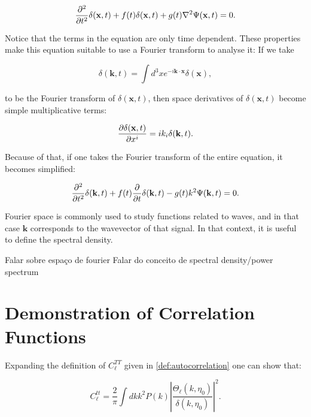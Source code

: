 \documentclass[openany,a4paper,12pt,oneside]{book}
\begin{document}
\begin{spacing}{1.5}
\begin{equation}\label{Four_Space:example_diff_eq}
	\pdv[2]{}{t} \delta(\mathbf{x},t) +f(t)\delta(\mathbf{x},t) + g(t)\nabla^2\Psi(\mathbf{x},t)=0.
\end{equation}

Notice that the terms in the equation are only time dependent. These properties make this equation suitable to use a Fourier transform to analyse it: If we take

\begin{equation}
	\delta(\mathbf{k},t)=\int d^3x e^{-i\mathbf{k}\cdot \mathbf{x}}\delta(\mathbf{x}),
\end{equation}

\noindent to be the Fourier transform of $\delta(\mathbf{x},t)$, then space derivatives of $\delta(\mathbf{x},t)$ become simple multiplicative terms:

\begin{equation}
	\pdv{\delta(\mathbf{x},t)}{x^i}=ik_i\delta(\mathbf{k},t).
\end{equation}

Because of that, if one takes the Fourier transform of the entire equation, it becomes simplified:

\begin{equation}\label{Four_Space:final_eq}
	\pdv[2]{}{t}\delta(\mathbf{k},t)+f(t)\pdv{}{t}\delta(\mathbf{k},t)-g(t)k^2\Psi(\mathbf{k},t)=0.
\end{equation}

Fourier space is commonly used to study functions related to waves, and in that case $\mathbf{k}$ corresponds to the wavevector of that signal. In that context, it is useful to define the spectral density.

Falar sobre espaço de fourier
Falar do conceito de spectral density/power spectrum
\fi

\chapter{Demonstration of Correlation Functions}\label{App:correlations_demo}

Expanding the definition of $C_\ell^{TT}$ given in \eqref{def:autocorrelation} one can show that\cite{dodelson2020modern}:

\begin{equation}\label{demo:Start_eq}
	C_\ell^{tt}=\frac{2}{\pi}\int dk k^2P(k)\left|\frac{\Theta_\ell(k,\eta_0)}{\delta(k,\eta_0)}\right|^2.
\end{equation}


\end{spacing}
\end{document}
